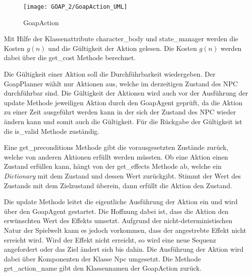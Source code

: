\begin{figure}[h]
  \centering
  \texttt{[image: GOAP\_2/GoapAction\_UML]}
	\captionsetup{justification=justified, format=plain}
  \caption{GoapAction}
  \label{GoapAction}
\end{figure}

Mit Hilfe der Klassenattribute character\_body und state\_manager werden die Kosten $g(n)$ und die Gültigkeit der Aktion gelesen. Die Kosten $g(n)$ werden dabei über die get\_cost Methode berechnet.

Die Gültigkeit einer Aktion soll die Durchführbarkeit wiedergeben. Der GoapPlanner wählt nur Aktionen aus, welche im derzeitigen Zustand des NPC durchführbar sind. Die Gültigkeit der Aktionen wird auch vor der Ausführung der update Methode jeweiligen Aktion durch den GoapAgent geprüft, da die Aktion zu einer Zeit ausgeführt werden kann in der sich der Zustand des NPC wieder ändern kann und somit auch die Gültigkeit. Für die Rückgabe der Gültigkeit ist die is\_valid Methode zuständig.

Eine get\_preconditions Methode gibt die vorausgesetzten Zustände zurück, welche von anderen Aktionen erfüllt werden müssten. Ob eine Aktion einen Zustand erfüllen kann, hängt von der get\_effects Methode ab, welche ein \textit{Dictionary} mit dem Zustand und dessen Wert zurückgibt. Stimmt der Wert des Zustands mit dem Zielzustand überein, dann erfüllt die Aktion den Zustand.

Die update Methode leitet die eigentliche Ausführung der Aktion ein und wird über den GoapAgent gestartet. Die Hoffnung dabei ist, dass die Aktion den erwünschten Wert des Effekts umsetzt. Aufgrund der nicht-deterministischen Natur der Spielwelt kann es jedoch vorkommen, dass der angestrebte Effekt nicht erreicht wird. Wird der Effekt nicht erreicht, so wird eine neue Sequenz angefordert oder das Ziel ändert sich bis dahin. Die Ausführung der Aktion wird dabei über Komponenten der Klasse Npc umgesetzt. Die Methode get\_action\_name gibt den Klassennamen der GoapAction zurück.

%
